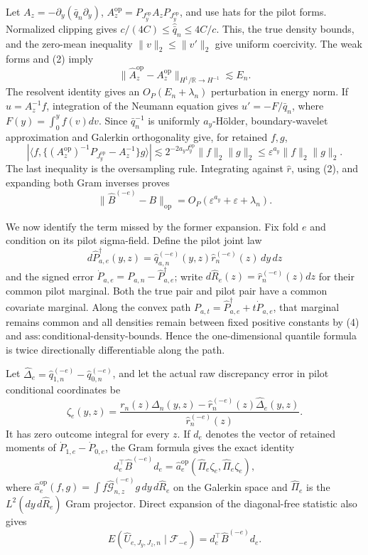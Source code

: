 Let \(A_z=-\partial_y(\bar q_n\partial_y)\), \(A_z^{\mathrm{op}}=P_{J_y^{\mathrm{op}}}A_zP_{J_y^{\mathrm{op}}}\), and use hats for the pilot forms. Normalized clipping gives \(c/(4C)\le\widehat{\bar q}_n\le4C/c\). This, the true density bounds, and the zero-mean inequality \(\|v\|_2\le\|v'\|_2\) give uniform coercivity. The weak forms and (2) imply
\[
\|\widehat A_z^{\mathrm{op}}-A_z^{\mathrm{op}}\|_{H^1/\mathbb R\to H^{-1}}
\lesssim E_n.                                                     \tag{6}
\]
The resolvent identity gives an \(O_P(E_n+\lambda_n)\) perturbation in energy norm. If \(u=A_z^{-1}f\), integration of the Neumann equation gives \(u'=-F/\bar q_n\), where \(F(y)=\int_0^yf(v)dv\). Since \(\bar q_n^{-1}\) is uniformly \(a_y\)-H\"older, boundary-wavelet approximation and Galerkin orthogonality give, for retained \(f,g\),
\[
|\langle f,\{(A_z^{\mathrm{op}})^{-1}P_{J_y^{\mathrm{op}}}-A_z^{-1}\}g\rangle|
\lesssim2^{-2a_yJ_y^{\mathrm{op}}}\|f\|_2\|g\|_2
\le\varepsilon^{a_y}\|f\|_2\|g\|_2.                           \tag{7}
\]
The last inequality is the oversampling rule. Integrating against \(\widehat r\), using (2), and expanding both Gram inverses proves
\[
\|\widehat B^{(-e)}-B\|_{\mathrm{op}}
=O_P(\varepsilon^{a_y}+\varepsilon+\lambda_n).                   \tag{8}
\]

We now identify the term missed by the former expansion. Fix fold \(e\) and condition on its pilot sigma-field. Define the pilot joint law
\[
d\widehat P_{a,e}^{\dagger}(y,z)
=\widehat q_{a,n}^{(-e)}(y,z)\widehat r_n^{(-e)}(z)\,dy\,dz
\]
and the signed error \(\dot P_{a,e}=P_{a,n}-\widehat P_{a,e}^{\dagger}\); write \(d\widehat R_e(z)=\widehat r_n^{(-e)}(z)dz\) for their common pilot marginal. Both the true pair and pilot pair have a common covariate marginal.  Along the convex path \(P_{a,t}=\widehat P_{a,e}^{\dagger}+t\dot P_{a,e}\), that marginal remains common and all densities remain between fixed positive constants by (4) and \(\mathrm{ass{:}conditional\text{-}density\text{-}bounds}\). Hence the one-dimensional quantile formula is twice directionally differentiable along the path.

Let \(\widehat\Delta_e=\widehat q_{1,n}^{(-e)}-\widehat q_{0,n}^{(-e)}\), and let the actual raw discrepancy error in pilot conditional coordinates be
\[
\zeta_e(y,z)
=\frac{r_n(z)\Delta_n(y,z)-\widehat r_n^{(-e)}(z)\widehat\Delta_e(y,z)}
{\widehat r_n^{(-e)}(z)}.                                        \tag{9}
\]
It has zero outcome integral for every \(z\). If \(d_e\) denotes the vector of retained moments of \(\dot P_{1,e}-\dot P_{0,e}\), the Gram formula gives the exact identity
\[
d_e^\top\widehat B^{(-e)}d_e
=\widehat a_e^{\mathrm{op}}(\widehat\Pi_e\zeta_e,\widehat\Pi_e\zeta_e),       \tag{10}
\]
where \(\widehat a_e^{\mathrm{op}}(f,g)=\int f\widehat{\mathcal G}_{n,z}^{(-e)}g\,dy\,d\widehat R_e\) on the Galerkin space and \(\widehat\Pi_e\) is the \(L^2(dy\,d\widehat R_e)\) Gram projector. Direct expansion of the diagonal-free statistic also gives
\[
E(\widehat U_{e,J_y,J_z,n}\mid\mathscr F_{-e})
=d_e^\top\widehat B^{(-e)}d_e.                                  \tag{11}
\]

